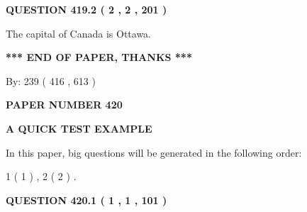 \documentclass[12pt]{article}
\begin{document}
 
  
\vspace{0.2in}
  
{\textbf{\Large{QUESTION
419.2 
 ( 2 , 2 , 201 )
}}}
  
  
 
 
\noindent{}
 
 
The capital of Canada is Ottawa.
 
 
 
 
   
   
 \vspace{0.2in}
 
   
   
   
   
\vspace{1.0in} 
{\textbf{\large{ *** END OF PAPER, THANKS *** }}} 
   
   
\hspace{1.0in} By: 
 239 ( 416 ,  613 )
   
   
   
   
\newpage 
\setcounter{page}{ 
   420001 } 
   
   
   
   
 {\textbf{ \Large{ PAPER NUMBER  420  }}}
   
   
\vspace{0.2in}
   
   
   
   
   
   
 \vspace{0.2in}
{\LARGE {\textbf{ A QUICK TEST EXAMPLE}}}
   
   
   
\vspace{0.2in}
   
In this paper, big questions will be generated in the following order: 
   
   
   1 ( 1 )
 ,
   2 ( 2 )
 .
  
\vspace{0.2in}
  
{\textbf{\Large{QUESTION
420.1 
 ( 1 , 1 , 101 )
}}}
  
  
 
 
\noindent{}
\end{document}

